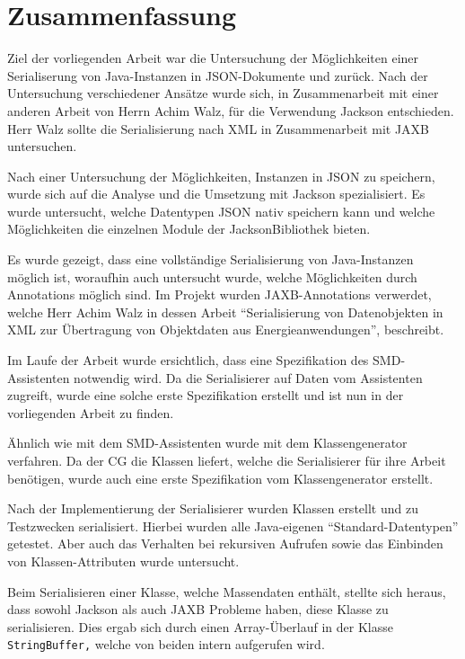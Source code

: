 \section{Zusammenfassung}
Ziel der vorliegenden Arbeit war die Untersuchung der M\"oglichkeiten einer Serialiserung von Java-Instanzen in \ac{JSON}-Dokumente und zur\"uck. Nach der Untersuchung verschiedener Ans\"atze wurde sich, in Zusammenarbeit mit einer anderen Arbeit von Herrn Achim Walz, f\"ur die Verwendung Jackson entschieden. Herr Walz sollte die Serialisierung nach XML  in Zusammenarbeit mit \ac{JAXB} untersuchen. \cite{Wal14}

Nach einer Untersuchung der M\"oglichkeiten, Instanzen in \ac{JSON} zu speichern, wurde sich auf die Analyse und die Umsetzung mit Jackson spezialisiert. Es wurde untersucht, welche Datentypen \ac{JSON} nativ speichern kann und welche M\"oglichkeiten die einzelnen Module der JacksonBibliothek bieten.

Es wurde gezeigt, dass eine vollst\"andige Serialisierung von Java-Instanzen m\"oglich ist, woraufhin auch untersucht wurde, welche M\"oglichkeiten durch Annotations m\"oglich sind. Im Projekt wurden \ac{JAXB}-Annotations verwerdet, welche Herr Achim Walz in dessen Arbeit "`Serialisierung von Datenobjekten in XML zur \"Ubertragung von Objektdaten aus Energieanwendungen"', beschreibt.

Im Laufe der Arbeit wurde ersichtlich, dass eine Spezifikation des \ac{SMD}-Assistenten notwendig wird. Da die Serialisierer auf Daten vom Assistenten zugreift, wurde eine solche erste Spezifikation erstellt und ist nun in der vorliegenden Arbeit zu finden.

\"Ahnlich wie mit dem \ac{SMD}-Assistenten wurde mit dem Klassengenerator verfahren. Da der \ac{CG} die Klassen liefert, welche die Serialisierer f\"ur ihre Arbeit ben\"otigen, wurde auch eine erste Spezifikation vom Klassengenerator erstellt.

Nach der Implementierung der Serialisierer wurden Klassen erstellt und zu Testzwecken serialisiert. Hierbei wurden alle Java-eigenen "`Standard-Datentypen"' getestet. Aber auch das Verhalten bei rekursiven Aufrufen sowie das Einbinden von Klassen-Attributen wurde untersucht.

Beim Serialisieren einer Klasse, welche Massendaten enth\"alt, stellte sich heraus, dass sowohl Jackson als auch JAXB Probleme haben, diese Klasse zu serialisieren. Dies ergab sich durch einen Array-\"Uberlauf in der Klasse \texttt{StringBuffer,} welche von beiden intern aufgerufen wird.


